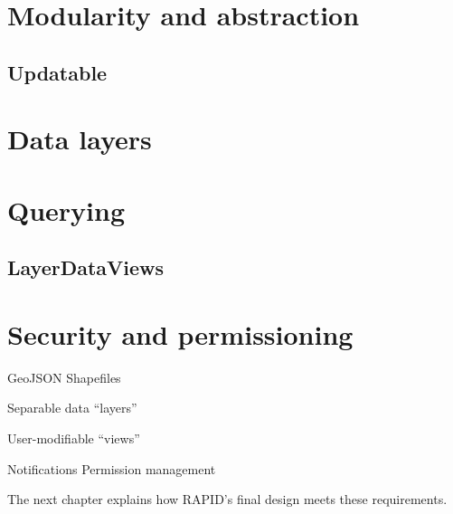 \section{Modularity and abstraction}
\subsection{Updatable}


\section{Data layers}

\section{Querying}
\subsection{LayerDataViews}


\section{Security and permissioning}





GeoJSON
Shapefiles


Separable data ``layers''

User-modifiable ``views''


Notifications
Permission management


The next chapter explains how RAPID's final design meets these requirements.

